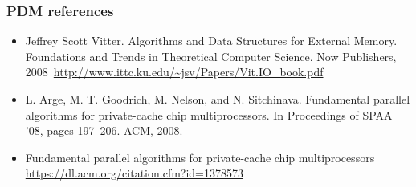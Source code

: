 \documentclass[12pt,aspectratio=169]{beamer}
\begin{document}
\begin{frame}\frametitle{PDM references}
  \small
  \begin{itemize}
    \item
Jeffrey Scott Vitter.
Algorithms and Data Structures for External Memory.
Foundations and Trends in Theoretical Computer Science.
Now Publishers, 2008~\url{http://www.ittc.ku.edu/~jsv/Papers/Vit.IO_book.pdf}
\item
L. Arge, M. T. Goodrich, M. Nelson, and N. Sitchinava. Fundamental
parallel algorithms for private-cache chip multiprocessors. In Proceedings
of SPAA ’08, pages 197–206. ACM, 2008.
\item
  Fundamental parallel algorithms for private-cache chip multiprocessors
\url{https://dl.acm.org/citation.cfm?id=1378573}
\end{itemize}
\end{frame}
\end{document}
